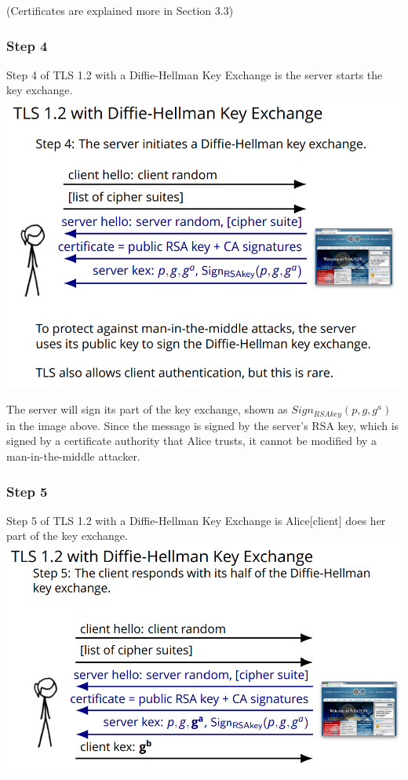 \documentclass[11pt]{article} %
\begin{document}
(Certificates are explained more in Section 3.3)

\subsubsection{Step 4}
Step 4 of TLS 1.2 with a Diffie-Hellman Key Exchange is the server starts the 
key exchange.\\

\includegraphics[scale=.8]{./DiffieStep4.png}

 The server will sign its part of the key exchange, shown as 
 $Sign_{RSAkey}(p,g,g^a)$ in the image above. Since the message is signed by 
 the server's RSA key, which is signed by a certificate authority that Alice 
 trusts, it cannot be modified by a man-in-the-middle attacker.

\newpage
\subsubsection{Step 5}
Step 5 of TLS 1.2 with a Diffie-Hellman Key Exchange is Alice[client] does her 
part of the key exchange. \\

\includegraphics[scale=.8]{./DiffieStep5.png}
\end{document}
